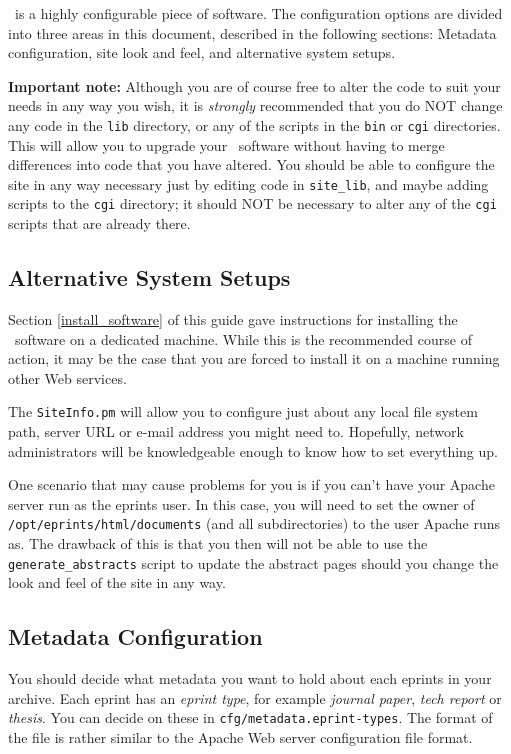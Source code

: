{\eprints\ is a highly configurable piece of software. The configuration options are divided into three areas in this document, described in the following sections: Metadata configuration, site look and feel, and alternative system setups.

{\bf Important note:} Although you are of course free to alter the code to suit your needs in any way you wish, it is \emph{strongly} recommended that you do NOT change any code in the {\tt lib} directory, or any of the scripts in the {\tt bin} or {\tt cgi} directories. This will allow you to upgrade your \eprints\ software without having to merge differences into code that you have altered. You should be able to configure the site in any way necessary just by editing code in {\tt site\_lib}, and maybe adding scripts to the {\tt cgi} directory; it should NOT be necessary to alter any of the {\tt cgi} scripts that are already there.


\subsection{Alternative System Setups}
\label{install_alternative}

Section \ref{install_software} of this guide gave instructions for installing the \eprints\ software on a dedicated machine. While this is the recommended course of action, it may be the case that you are forced to install it on a machine running other Web services.

The {\tt SiteInfo.pm} will allow you to configure just about any local file system path, server URL or e-mail address you might need to. Hopefully, network administrators will be knowledgeable enough to know how to set everything up.

One scenario that may cause problems for you is if you can't have your Apache server run as the eprints user. In this case, you will need to set the owner of {\tt /opt/eprints/html/documents} (and all subdirectories) to the user Apache runs as. The drawback of this is that you then will not be able to use the {\tt generate\_abstracts} script to update the abstract pages should you change the look and feel of the site in any way.


\subsection{Metadata Configuration}
\label{install_metadata}

You should decide what metadata you want to hold about each eprints in your archive. Each eprint has an \emph{eprint type}, for example \emph{journal paper}, \emph{tech report} or \emph{thesis}. You can decide on these in {\tt cfg/metadata.eprint-types}. The format of the file is rather similar to the Apache Web server configuration file format.

}
